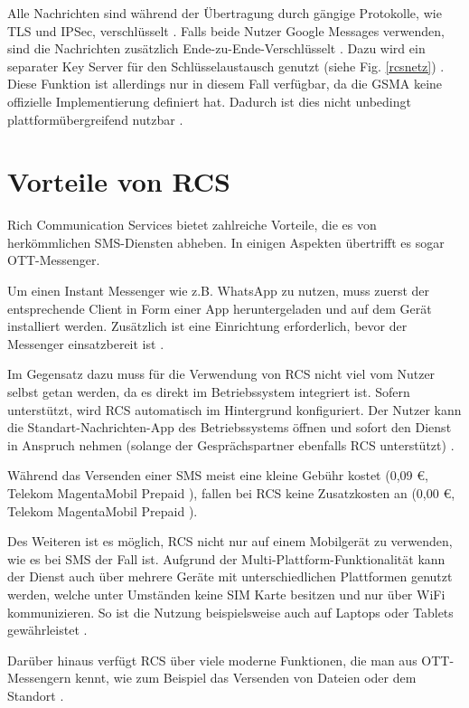 \documentclass[conference]{IEEEtran}
\begin{document}
Alle Nachrichten sind während der Übertragung durch gängige Protokolle, wie TLS und IPSec, verschlüsselt \cite{uniprof}.
Falls beide Nutzer Google Messages verwenden, sind die Nachrichten zusätzlich Ende-zu-Ende-Verschlüsselt \cite{googlemessagessecure}.
Dazu wird ein separater Key Server für den Schlüsselaustausch genutzt (siehe Fig. \ref{rcsnetz}) \cite{5gmsg}.
Diese Funktion ist allerdings nur in diesem Fall verfügbar, da die GSMA keine offizielle Implementierung definiert hat.
Dadurch ist dies nicht unbedingt plattformübergreifend nutzbar \cite{googlemessagessecure}.


\section{Vorteile von RCS}

Rich Communication Services bietet zahlreiche Vorteile, die es von herkömmlichen SMS-Diensten abheben.
In einigen Aspekten übertrifft es sogar OTT-Messenger.

Um einen Instant Messenger wie z.B. WhatsApp zu nutzen, muss zuerst der entsprechende Client in Form einer App heruntergeladen und auf dem Gerät installiert werden.
Zusätzlich ist eine Einrichtung erforderlich, bevor der Messenger einsatzbereit ist \cite{5gmsg,rcsmno}.

Im Gegensatz dazu muss für die Verwendung von RCS nicht viel vom Nutzer selbst getan werden, da es direkt im Betriebssystem integriert ist.
Sofern unterstützt, wird RCS automatisch im Hintergrund konfiguriert.
Der Nutzer kann die Standart-Nachrichten-App des Betriebssystems öffnen und sofort den Dienst in Anspruch nehmen (solange der Gesprächspartner ebenfalls RCS unterstützt) \cite{5gmsg,rcsmno}.

Während das Versenden einer SMS meist eine kleine Gebühr kostet (0,09 €, Telekom MagentaMobil Prepaid \cite{telekomsms}), fallen bei RCS keine Zusatzkosten an (0,00 €, Telekom MagentaMobil Prepaid \cite{telekomrcs}).

Des Weiteren ist es möglich, RCS nicht nur auf einem Mobilgerät zu verwenden, wie es bei SMS der Fall ist.
Aufgrund der Multi-Plattform-Funktionalität kann der Dienst auch über mehrere Geräte mit unterschiedlichen Plattformen genutzt werden, welche unter Umständen keine SIM Karte besitzen und nur über WiFi kommunizieren.
So ist die Nutzung beispielsweise auch auf Laptops oder Tablets gewährleistet \cite{rcsmno,uniprof}.

Darüber hinaus verfügt RCS über viele moderne Funktionen, die man aus OTT-Messengern kennt, wie zum Beispiel das Versenden von Dateien oder dem Standort \cite{wafaq,uniprof}.
\end{document}

